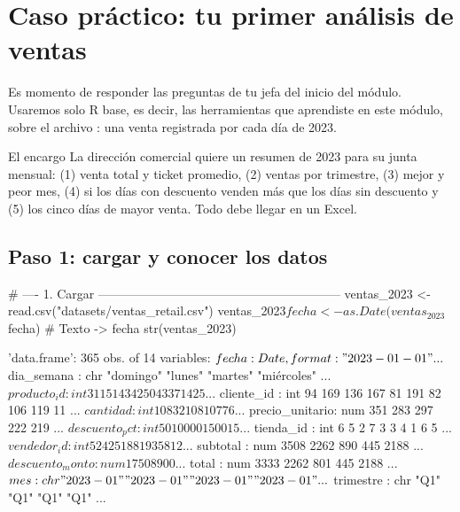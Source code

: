 \section{Caso práctico: tu primer análisis de ventas}
\label{sec:m1-caso}

Es momento de responder las preguntas de tu jefa del inicio del módulo.
Usaremos solo R base, es decir, las herramientas que aprendiste en este
módulo, sobre el archivo : una venta registrada
por cada día de 2023.

\begin{negocio}{El encargo}
La dirección comercial quiere un resumen de 2023 para su junta mensual:
(1) venta total y ticket promedio, (2) ventas por trimestre, (3) mejor y
peor mes, (4) si los días con descuento venden más que los días sin
descuento y (5) los cinco días de mayor venta. Todo debe llegar en un Excel.
\end{negocio}

\subsection{Paso 1: cargar y conocer los datos}

\begin{rcode}
# ---- 1. Cargar -----------------------------------------------------------
ventas_2023 <- read.csv("datasets/ventas_retail.csv")
ventas_2023$fecha <- as.Date(ventas_2023$fecha)   # Texto -> fecha
str(ventas_2023)
\end{rcode}
\begin{rsalida}
'data.frame':   365 obs. of  14 variables:
 $ fecha          : Date, format: "2023-01-01" ...
 $ dia_semana     : chr  "domingo" "lunes" "martes" "miércoles" ...
 $ producto_id    : int  31 15 14 3 42 50 43 37 14 25 ...
 $ cliente_id     : int  94 169 136 167 81 191 82 106 119 11 ...
 $ cantidad       : int  10 8 3 2 10 8 10 7 7 6 ...
 $ precio_unitario: num  351 283 297 222 219 ...
 $ descuento_pct  : int  5 0 10 0 0 0 15 0 0 15 ...
 $ tienda_id      : int  6 5 2 7 3 3 4 1 6 5 ...
 $ vendedor_id    : int  5 24 25 18 8 19 3 5 8 12 ...
 $ subtotal       : num  3508 2262 890 445 2188 ...
 $ descuento_monto: num  175 0 89 0 0 ...
 $ total          : num  3333 2262 801 445 2188 ...
 $ mes            : chr  "2023-01" "2023-01" "2023-01" "2023-01" ...
 $ trimestre      : chr  "Q1" "Q1" "Q1" "Q1" ...
\end{rsalida}

